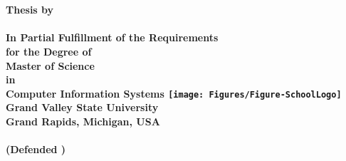 
\thispagestyle{empty}

\begingroup
\centering
{}
~
\\[1em]
\normalfont\bfseries\fontsize{26}{31.2}\selectfont
\DocumentTitle
\\[0.4in]
\normalfont\large
Thesis by
\\[0.25em]
\normalfont\bfseries\Large
\AuthorName
\\[0.4in]
\normalfont\normalsize
In Partial Fulfillment of the Requirements
\\[0.5em]
for the Degree of
\\[0.5em]
Master of Science
\\[0.5em]
in
\\[0.5em]
Computer Information Systems
\vfill
\texttt{[image: Figures/Figure-SchoolLogo]}
\\[1.5em]
Grand Valley State University
\\[0.5em]
Grand Rapids, Michigan, USA
\\[1.5em]
\Year
\\[0.5em]
(Defended \DefenseDate)
\par
\endgroup

\clearpage
